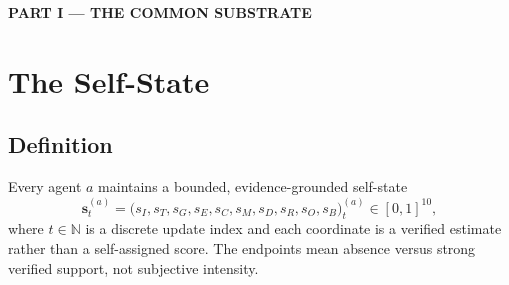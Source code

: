 \documentclass[11pt]{article}
\begin{document}
\newpage
\begin{center}\large\bfseries PART I --- THE COMMON SUBSTRATE\end{center}

\section{The Self-State}
\label{sec:coords}

\subsection{Definition}

Every agent $a$ maintains a bounded, evidence-grounded self-state
\begin{equation}
\mathbf{s}^{(a)}_t=\big(s_{I},s_{T},s_{G},s_{E},s_{C},s_{M},s_{D},s_{R},s_{O},s_{B}\big)^{(a)}_t\in[0,1]^{10},
\label{eq:state}
\end{equation}
where $t\in\mathbb{N}$ is a discrete update index and each coordinate is a verified estimate rather than a self-assigned score. The endpoints mean absence versus strong verified support, not subjective intensity.
\end{document}
